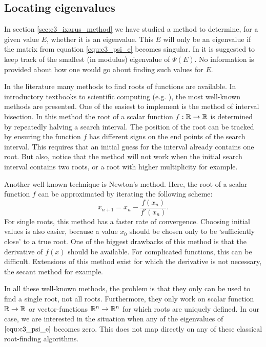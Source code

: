 \subsection{Locating eigenvalues}\label{sec:c3_locating_e}

In section \ref{sec:c3_ixarus_method} we have studied a method to determine, for a given value $E$, whether it is an eigenvalue. This $E$ will only be an eigenvalue if the matrix from equation \eqref{equ:c3_psi_e} becomes singular. In \cite{ixaru_new_2010} it is suggested to keep track of the smallest (in modulus) eigenvalue of $\Psi(E)$. No information is provided about how one would go about finding such values for $E$.

In the literature many methods to find roots of functions are available. In introductory textbooks to scientific computing (e.g. \cite[Chapter~5]{heath_scientific_2002}), the most well-known methods are presented. One of the easiest to implement is the method of interval bisection. In this method the root of a scalar function $f : \mathbb{R} \to \mathbb{R}$ is determined by repeatedly halving a search interval. The position of the root can be tracked by ensuring the function $f$ has different signs on the end points of the search interval. This requires that an initial guess for the interval already contains one root. But also, notice that the method will not work when the initial search interval contains two roots, or a root with higher multiplicity for example.

Another well-known technique is Newton's method. Here, the root of a scalar function $f$ can be approximated by iterating the following scheme:
$$
  x_{n+1} = x_n - \frac{f(x_n)}{f'(x_n)}\text{.}
$$
For single roots, this method has a faster rate of convergence. Choosing initial values is also easier, because a value $x_0$ should be chosen only to be `sufficiently close' to a true root. One of the biggest drawbacks of this method is that the derivative of $f(x)$ should be available. For complicated functions, this can be difficult. Extensions of this method exist for which the derivative is not necessary, the secant method for example.

In all these well-known methods, the problem is that they only can be used to find a single root, not all roots. Furthermore, they only work on scalar function $\mathbb{R} \to \mathbb{R}$ or vector-functions $\mathbb{R}^n \to \mathbb{R}^n$ for which roots are uniquely defined. In our case, we are interested in the situation when any of the eigenvalues of $\eqref{equ:c3_psi_e}$ becomes zero. This does not map directly on any of these classical root-finding algorithms.

